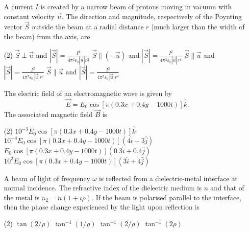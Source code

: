 \begin{enumerate}
\begin{minipage}{\textwidth}
	\item A current $I$ is created by a narrow beam of protons moving in vacuum with constant velocity $\vec{u}$. The direction and magnitude, respectively of the Poynting vector $\vec{S}$ outside the beam at a radial distance $r$ (much larger than the width of the beam) from the axis, are
\end{minipage}
\begin{tasks}(2)
	\task[\textbf{A.}] $\vec{S} \perp \vec{u}$ and $|\vec{S}|=\frac{I^{2}}{4 \pi^{2} \varepsilon_{0}|\vec{u}| r^{2}}$
	\task[\textbf{B.}]$\vec{S} \|(-\vec{u})$ and $|\vec{S}|=\frac{I^{2}}{4 \pi^{2} \varepsilon_{0}|\vec{u}| r^{4}}$
	\task[\textbf{C.}]$\vec{S} \| \vec{u}$ and $|\vec{S}|=\frac{I^{2}}{4 \pi^{2} \varepsilon_{0}|\vec{u}| r^{2}}$
	\task[\textbf{D.}]$\vec{S} \| \vec{u}$ and $|\vec{S}|=\frac{I^{2}}{4 \pi^{2} \varepsilon_{0}|\vec{u}| r^{4}}$
\end{tasks}
\begin{minipage}{\textwidth}
	\item The electric field of an electromagnetic wave is given by
	$$
	\vec{E}=E_{0} \cos [\pi(0.3 x+0.4 y-1000 t)] \hat{k} .
	$$
	The associated magnetic field $\vec{B}$ is
\end{minipage}
\begin{tasks}(2)
	\task[\textbf{A.}] $10^{-3} E_{0} \cos [\pi(0.3 x+0.4 y-1000 t)] \hat{k}$
	\task[\textbf{B.}]$10^{-4} E_{0} \cos [\pi(0.3 x+0.4 y-1000 t)](4 \hat{i}-3 \hat{j})$
	\task[\textbf{C.}]$E_{0} \cos [\pi(0.3 x+0.4 y-1000 t)](0.3 \hat{i}+0.4 \hat{j})$
	\task[\textbf{D.}]$10^{2} E_{0} \cos [\pi(0.3 x+0.4 y-1000 t)](3 \hat{i}+4 \hat{j})$
\end{tasks}
\begin{minipage}{\textwidth}
	\item A beam of light of frequency $\omega$ is reflected from a dielectric-metal interface at normal incidence. The refractive index of the dielectric medium is $n$ and that of the metal is $n_{2}=n(1+i \rho)$. If the beam is polarised parallel to the interface, then the phase change experienced by the light upon reflection is
\end{minipage}
\begin{tasks}(2)
	\task[\textbf{A.}] $\tan (2 / \rho)$ 
	\task[\textbf{B.}]$\tan ^{-1}(1 / \rho)$
	\task[\textbf{C.}]$\tan ^{-1}(2 / \rho)$
	\task[\textbf{D.}]$\tan ^{-1}(2 \rho)$
\end{tasks}

\end{enumerate}
